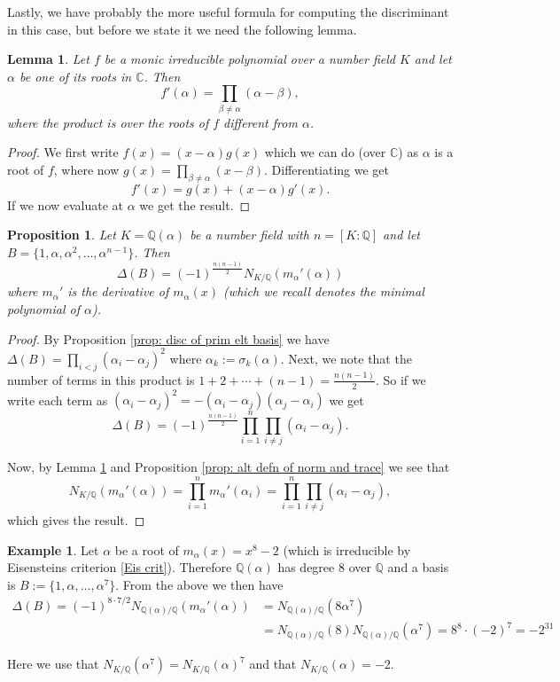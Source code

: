 \documentclass[11pt,a4paper]{report}
\theoremstyle{plain}
\newtheorem{lem}[subsection]{Lemma}
\newtheorem{prop}[subsection]{Proposition}
\theoremstyle{definition}
\newtheorem{exmp}[subsection]{Example}
\theoremstyle{definition}
\def\CC{\mathbb{C}}
\def\QQ{\mathbb{Q}}
\def \a{\alpha}
\begin{document}
Lastly, we have probably the more useful formula for computing the discriminant in this case, but before we state it we need the following lemma.

\begin{lem}\label{lem: diff of irr pol}
	Let $f$ be a monic irreducible polynomial over a number field $K$ and let $\a$ be one of its roots in $\CC$. Then \[f'(\a)=\prod_{\beta \neq \a} (\a-\beta),  \] where the product is over the roots of $f$ different from $\a$.
\end{lem}

\begin{proof}
	We first write $f(x)=(x-\a)g(x)$ which we can do (over $\CC$) as $\a$ is a root of $f$, where now $g(x)=\prod_{\beta \neq \a} (x-\beta)$. Differentiating we get \[f'(x)=g(x)+(x-\a)g'(x).\] If we now evaluate at $\a$ we get the result.
\end{proof}


\begin{prop}\label{prop: num field disc in terms of norm}
	Let $K=\QQ(\a)$ be a number field with $n=[K:\QQ]$ and let $B=\{1,\a,\a^2,\dots,\a^{n-1}\}$. Then \[\Delta(B)=(-1)^{\frac{n(n-1)}{2}}N_{K/\QQ}(m_\a'(\a))\] where $m_\a'$ is the derivative of $m_\a(x)$ (which we recall denotes the minimal polynomial of $\a$).
	
\end{prop}
\begin{proof}
	By Proposition \ref{prop: disc of prim elt basis} we have $\Delta(B)=\prod_{i < j}(\a_i-\a_j)^2$ where $\a_k:=\sigma_k(\a)$. Next, we note that the number of terms in this product is $1+2+\cdots+(n-1)=\frac{n(n-1)}{2}$. So if we write each term as $(\a_i-\a_j)^2=-(\a_i-\a_j)(\a_j-\a_i)$ we get \[\Delta(B)=(-1)^{\frac{n(n-1)}{2}}\prod_{i=1}^n \prod_{i \neq j} (\a_i-\a_j). \]
	
	Now, by Lemma \ref{lem: diff of irr pol} and Proposition \ref{prop: alt defn of norm and trace} we see that \[N_{K/\QQ}(m_\a'(\a))=\prod_{i=1}^n m_\a'(\a_i)=\prod_{i=1}^n \prod_{i \neq j} (\a_i-\a_j),\] which gives the result.
	
	
\end{proof}

\begin{exmp}\label{exmp: disc of x^8-2}
	Let $\a$ be a root of $m_\a(x)=x^8-2$ (which is irreducible by Eisensteins criterion \ref{Eis crit}). Therefore $\QQ(\a)$ has degree $8$ over $\QQ$ and a basis is $B:=\{1,\a,\dots,\a^7\}$. From the above we then have \begin{align*}\Delta(B)= (-1)^{8\cdot7/2} N_{\QQ(\a)/\QQ} (m_\a'(\a))&= N_{\QQ(\a)/\QQ} (8\a^7)\\&=N_{\QQ(\a)/\QQ}(8) N_{\QQ(\a)/\QQ}(\a^7)=8^8 \cdot (-2)^7=-2^{31}\end{align*}
	
	Here we use that $N_{K/\QQ}(\a^7)=N_{K/\QQ}(\a)^7$ and that $N_{K/\QQ}(\a)=-2$. 
\end{exmp}
\end{document}
